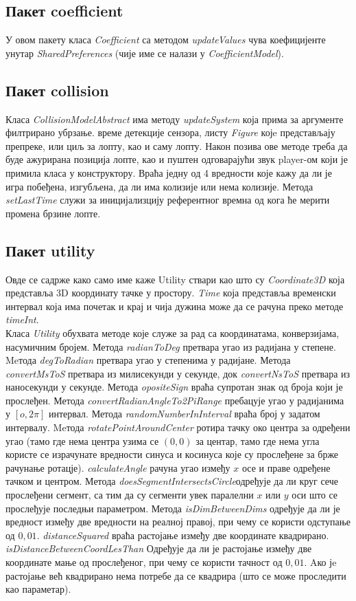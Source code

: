 \subsection{Пакет coefficient}
У овом пакету класа \emph{Coefficient} са методом \emph{updateValues} чува коефицијенте унутар \emph{SharedPreferences} (чије име се налази у \emph{CoefficientModel}). 
\subsection{Пакет collision}
Класа \emph{CollisionModelAbstract} има методу \emph{updateSystem} која прима за аргументе филтрирано убрзање. време детекције сензора, листу  \emph{Figure} којe представљају препреке, или циљ за лопту, као и саму лопту. Након позива ове методе треба да буде ажурирана позиција лопте, као и пуштен одговарајући звук player-ом који је примила класа у конструктору. Враћа једну од 4 вредности које кажу да ли је игра побеђена, изгубљена, да ли има колизије или нема колизије. Метода \emph{setLastTime} служи за иницијализцију референтног времна од кога ће мерити промена брзине лопте.
\subsection{Пакет utility}
Овде се садрже како само име каже Utility ствари као што су \emph{Coordinate3D} која представља 3D координату тачке у простору. \emph{Time} која представља временски интервал која има почетак и крај и чија дужина може да се рачуна преко методе \emph{timeInt}.  
\\ \indent 
Класа \emph{Utility} обухвата методе које служе за рад са координатама, конверзијама, насумичним бројем. Метода \emph{radianToDeg} претвара угао из радијана у степене. Meтода \emph{degToRadian} претвара угао у степенима у радијане.  Метода \emph{convertMsToS} претвара из милисекунди у секунде, док \emph{convertNsToS} претвара из наносекунди у секунде. Метода \emph{opositeSign }враћа супротан знак од броја који је прослеђен. Метода \emph{convertRadianAngleTo2PiRange} пребацује угао у радијанима у $\left[ o, 2 \pi \right]$ интервал. Метода \emph{randomNumberInInterval} враћа број у задатом интервалу. Meтода \emph{rotatePointAroundCenter} ротира тачку око центра за одређени угао (тамо где нема центра узима се $(0, 0)$ за центар, тамо где нема угла користе се израчунате вредности синуса и косинуса које су прослеђене за брже рачунање ротацје). \emph{calculateAngle} рачуна угао између $x$ осе и праве одређене тачком и центром. Метода \emph{doesSegmentIntersectsCircle}одређује да ли круг сече прослеђени сегмент, са тим да су сегменти увек паралелни $x$ или $y$ оси што се прослеђује последњи параметром. Метода \emph{isDimBetweenDims} одређује да ли је вредност између две вредности на реалној правој, при чему се користи одступање од $0,01$. \emph{distanceSquared} враћа растојање између две координате квадрирано. \emph{isDistanceBetweenCoordLesThan} Одређује да ли је растојање између две координате мање од прослеђеног, при чему се користи тачност од $0,01$. Aко јe растојање већ квадрирано нема потребе да се квадрира (што се може проследити као параметар).